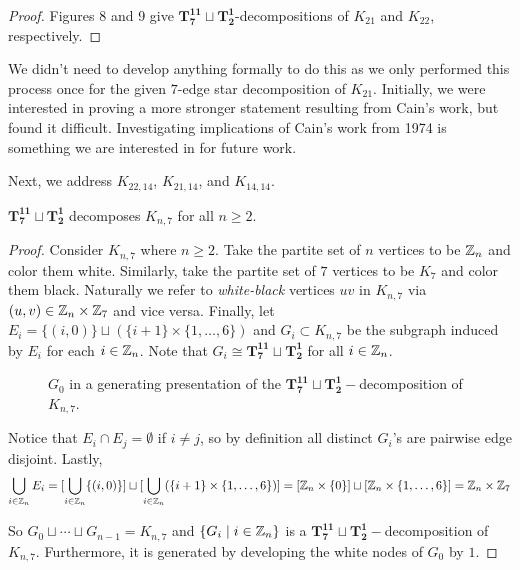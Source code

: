 \begin{proof}
     Figures 8 and 9 give $\mathbf{T_{7}^{11}}\sqcup\mathbf{T_{2}^{1}}$-decompositions of $K_{21}$ and $K_{22}$, respectively.%
\end{proof}
We didn't need to develop anything formally to do this as we only performed this process once for the given $7$-edge star decomposition of $K_{21}$. Initially, we were interested in proving a more stronger statement resulting from Cain's work, but found it difficult. Investigating implications of Cain's work \cite{Cain} from 1974 is something we are interested in for future work.

Next, we address $K_{22,14}$, $K_{21,14}$, and $K_{14,14}$. 
\newpage
\begin{thm} \label{thm:K_n,7}
    $\mathbf{T_{7}^{11}}\sqcup\mathbf{T_{2}^{1}}$ decomposes $K_{n,7}$ for all $n\geq 2$.
\end{thm}

\begin{proof}
    Consider $K_{n,7}$ where $n\geq 2$. Take the partite set of $n$ vertices to be $\mathbb{Z}_{n}$ and color them white. Similarly, take the partite set of $7$ vertices to be $K_{7}$ and color them black. Naturally we refer to \textit{white-black} vertices $uv$ in $K_{n,7}$ via $(u,v)\in \mathbb{Z}_{n}\times\mathbb{Z}_{7}$ and vice versa. Finally, let $E_{i}=\{(i,0)\}\sqcup (\{i+1\}\times \{1,\hdots,6\})$ and $G_{i}\subset K_{n,7}$ be the subgraph induced by $E_{i}$ for each $i\in \mathbb{Z}_{n}$. Note that $G_{i}\cong \mathbf{T_{7}^{11}}\sqcup\mathbf{T_{2}^{1}}$ for all $i\in \mathbb{Z}_{n}$.

    \begin{figure}[H]
        \centering
        
        \caption{$G_{0}$ in a generating presentation of the $\mathbf{T_{7}^{11}}\sqcup\mathbf{T_{2}^{1}}-$decomposition of $K_{n,7}$.}
        \label{fig:starpathbip}
    \end{figure}

    \noindent Notice that $E_{i}\cap E_{j}=\emptyset$ if $i\neq j$, so by definition all distinct $G_{i}$'s are pairwise edge disjoint. Lastly,
    $$\bigcup_{i\in \mathbb{Z}_{n}} E_{i}=[\bigcup_{i\in \mathbb{Z}_{n}} \{(i,0)\}]\sqcup [\bigcup_{i\in \mathbb{Z}_{n}} (\{i+1\}\times \{1,\hdots, 6\})]=[\mathbb{Z}_{n}\times \{0\}]\sqcup [\mathbb{Z}_{n}\times \{1,\hdots, 6\}]=\mathbb{Z}_{n}\times \mathbb{Z}_{7}$$
    
    \noindent So $G_{0}\sqcup \cdots \sqcup G_{n-1}=K_{n,7}$ and $\{G_{i}\mid i\in \mathbb{Z}_{n}\}$ is a $\mathbf{T_{7}^{11}}\sqcup\mathbf{T_{2}^{1}}-$decomposition of $K_{n,7}$. Furthermore, it is generated by developing the white nodes of $G_{0}$ by $1$.
\end{proof}

